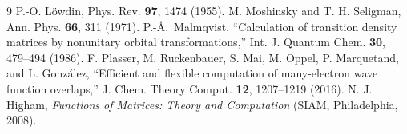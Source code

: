 \documentclass[aip,jcp,preprint]{revtex4-1}
\begin{document}
\begin{thebibliography}{9}
P.-O. L\"owdin, Phys. Rev. \textbf{97}, 1474 (1955).
M. Moshinsky and T. H. Seligman, Ann. Phys. \textbf{66}, 311 (1971).
P.-\AA.~Malmqvist,
``Calculation of transition density matrices by nonunitary orbital
transformations,''
Int. J. Quantum Chem. \textbf{30}, 479--494 (1986).
F. Plasser, M. Ruckenbauer, S. Mai, M. Oppel, P. Marquetand, and
L. Gonz\'alez,
``Efficient and flexible computation of many-electron wave function
overlaps,''
J. Chem. Theory Comput. \textbf{12}, 1207--1219 (2016).
N. J. Higham,
\emph{Functions of Matrices: Theory and Computation}
(SIAM, Philadelphia, 2008).
\end{thebibliography}
\end{document}

